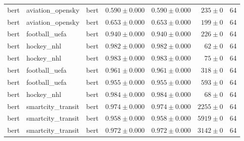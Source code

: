 \begin{table}[htbp]
\begin{tabular}{l l l r r r r}
bert & aviation\_opensky & bert & $0.590\pm0.000$ & $0.590\pm0.000$ & $235\pm0$ & 64 \\
bert & aviation\_opensky & bert & $0.653\pm0.000$ & $0.653\pm0.000$ & $199\pm0$ & 64 \\
bert & football\_uefa & bert & $0.940\pm0.000$ & $0.940\pm0.000$ & $226\pm0$ & 64 \\
bert & hockey\_nhl & bert & $0.982\pm0.000$ & $0.982\pm0.000$ & $62\pm0$ & 64 \\
bert & hockey\_nhl & bert & $0.983\pm0.000$ & $0.983\pm0.000$ & $75\pm0$ & 64 \\
bert & football\_uefa & bert & $0.961\pm0.000$ & $0.961\pm0.000$ & $318\pm0$ & 64 \\
bert & football\_uefa & bert & $0.955\pm0.000$ & $0.955\pm0.000$ & $593\pm0$ & 64 \\
bert & hockey\_nhl & bert & $0.984\pm0.000$ & $0.984\pm0.000$ & $68\pm0$ & 64 \\
bert & smartcity\_transit & bert & $0.974\pm0.000$ & $0.974\pm0.000$ & $2255\pm0$ & 64 \\
bert & smartcity\_transit & bert & $0.958\pm0.000$ & $0.958\pm0.000$ & $5919\pm0$ & 64 \\
bert & smartcity\_transit & bert & $0.972\pm0.000$ & $0.972\pm0.000$ & $3142\pm0$ & 64 \\
\hline
\end{tabular}
\end{table}
